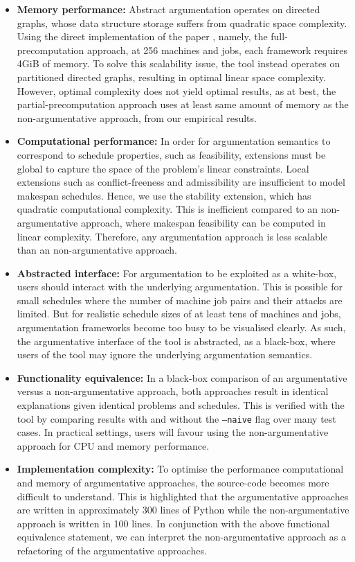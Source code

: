 \begin{itemize}
	\item\textbf{Memory performance:} Abstract argumentation operates on directed graphs, whose data structure storage suffers from quadratic space complexity. Using the direct implementation of the paper \cite{aes}, namely, the full-precomputation approach, at 256 machines and jobs, each framework requires 4GiB of memory. To solve this scalability issue, the tool instead operates on partitioned directed graphs, resulting in optimal linear space complexity. However, optimal complexity does not yield optimal results, as at best, the partial-precomputation approach uses at least same amount of memory as the non-argumentative approach, from our empirical results.
	\item\textbf{Computational performance:} In order for argumentation semantics to correspond to schedule properties, such as feasibility, extensions must be global to capture the space of the problem's linear constraints. Local extensions such as conflict-freeness and admissibility are insufficient to model makespan schedules. Hence, we use the stability extension, which has quadratic computational complexity. This is inefficient compared to an non-argumentative approach, where makespan feasibility can be computed in linear complexity. Therefore, any argumentation approach is less scalable than an non-argumentative approach.
	\item\textbf{Abstracted interface:} For argumentation to be exploited as a white-box, users should interact with the underlying argumentation. This is possible for small schedules where the number of machine job pairs and their attacks are limited. But for realistic schedule sizes of at least tens of machines and jobs, argumentation frameworks become too busy to be visualised clearly. As such, the argumentative interface of the tool is abstracted, as a black-box, where users of the tool may ignore the underlying argumentation semantics.
	\item\textbf{Functionality equivalence:} In a black-box comparison of an argumentative versus a non-argumentative approach, both approaches result in identical explanations given identical problems and schedules. This is verified with the tool by comparing results with and without the \texttt{--naive} flag over many test cases. In practical settings, users will favour using the non-argumentative approach for CPU and memory performance.
	\item\textbf{Implementation complexity: }To optimise the performance computational and memory of argumentative approaches, the source-code becomes more difficult to understand. This is highlighted that the argumentative approaches are written in approximately 300 lines of Python while the non-argumentative approach is written in 100 lines. In conjunction with the above functional equivalence statement, we can interpret the non-argumentative approach as a refactoring of the argumentative approaches.
\end{itemize}

